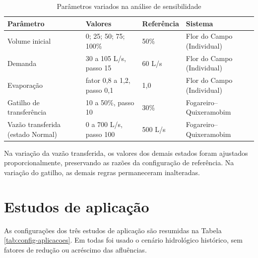 \begin{table}[H]
    \captionsetup{width=15cm}
    \caption{Parâmetros variados na análise de sensibilidade}
    \label{tab:sensibilidade-config}
    \centering
    \footnotesize
    \begin{tabular}{p{4.0cm}p{3.6cm}p{2.0cm}p{4.0cm}}
        \toprule
        Parâmetro & Valores & Referência & Sistema \\
        \midrule
        Volume inicial & 0; 25; 50; 75; 100\% & 50\% & Flor do Campo (Individual) \\
        Demanda & 30 a 105 L/s, passo 15 & 60 L/s & Flor do Campo (Individual) \\
        Evaporação & fator 0,8 a 1,2, passo 0,1 & 1,0 & Flor do Campo (Individual) \\
        Gatilho de transferência & 10 a 50\%, passo 10 & 30\% & Fogareiro--Quixeramobim \\
        Vazão transferida (estado Normal) & 0 a 700 L/s, passo 100 & 500 L/s & Fogareiro--Quixeramobim \\
        \bottomrule
    \end{tabular}
\end{table}

Na variação da vazão transferida, os valores dos demais estados foram ajustados proporcionalmente, preservando as razões da configuração de referência. Na variação do gatilho, as demais regras permaneceram inalteradas.

\section{Estudos de aplicação}
\label{sec:estudos-aplicacao}

As configurações dos três estudos de aplicação são resumidas na Tabela \ref{tab:config-aplicacoes}. Em todas foi usado o cenário hidrológico histórico, sem fatores de redução ou acréscimo das afluências.

